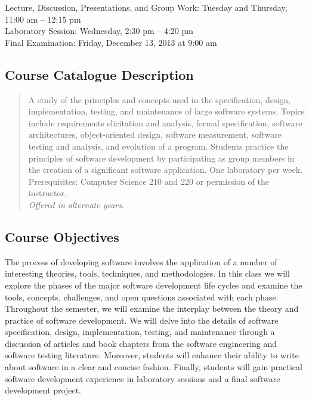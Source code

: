 Lecture, Discussion, Presentations, and Group Work: Tuesday and Thursday, 11:00 am -- 12:15 pm \\
Laboratory Session: Wednesday, 2:30 pm -- 4:20 pm \\
Final Examination: Friday, December 13, 2013 at 9:00 am

\subsection*{Course Catalogue Description}

\begin{quote}

	A study of the principles and concepts used in the specification, design, implementation, testing, and maintenance
	of large software systems. Topics include requirements elicitation and analysis, formal specification, software
	architectures, object-oriented design, software measurement, software testing and analysis, and evolution of a
	program.  Students practice the principles of software development by participating as group members in the creation
	of a significant software application. One laboratory per week. Prerequisites: Computer Science 210 and 220 or
	permission of the instructor. \\ {\em Offered in alternate years}.

\end{quote}

\subsection*{Course Objectives}

The process of developing software involves the application of a number of interesting theories, tools, techniques, and
methodologies.  In this class we will explore the phases of the major software development life cycles and examine the
tools, concepts, challenges, and open questions associated with each phase.  Throughout the semester, we will
examine the interplay between the theory and practice of software development.  We will delve into the details of
software specification, design, implementation, testing, and maintenance through a discussion of articles and book
chapters from the software engineering and software testing literature.  Moreover, students will enhance their ability
to write about software in a clear and concise fashion.  Finally, students will gain practical software development
experience in laboratory sessions and a final software development project.

